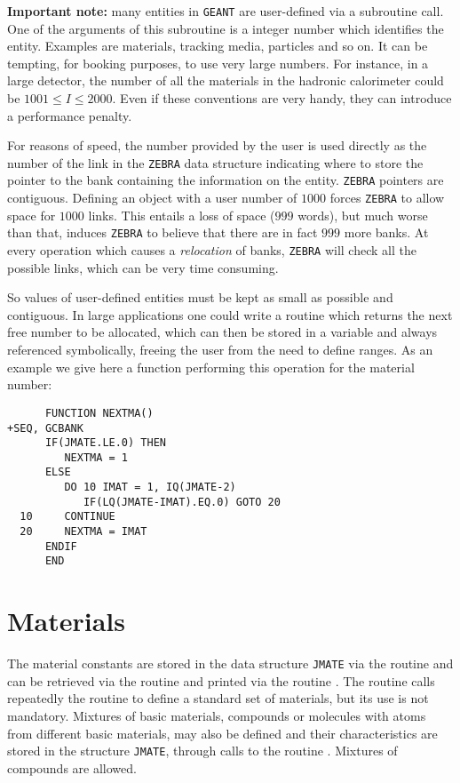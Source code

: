 {\bf Important note:} many entities in {\tt GEANT} are user-defined
via a subroutine call. One of the arguments of this subroutine is 
a integer number which identifies the entity. Examples are materials,
tracking media, particles and so on. It can be tempting, for booking
purposes, to use very large numbers. For instance, in a large detector,
the number of all the materials in the hadronic calorimeter could be
$1001 \leq I \leq 2000$. Even if these conventions are very handy, they
can introduce a performance penalty.

For reasons of speed, the number provided by the user is used directly
as the number of the link in the {\tt ZEBRA} data structure indicating
where to store the pointer to
the bank containing the information on the entity. {\tt ZEBRA} 
pointers are contiguous. Defining an object with a user number of $1000$
forces {\tt ZEBRA} to allow space for $1000$ links. This entails a loss
of space ($999$ words), but much worse than that, induces {\tt ZEBRA} to
believe that there are in fact $999$ more banks. At every operation which 
causes a {\it relocation} of banks, {\tt ZEBRA} will check all the possible 
links, which can be very time consuming.

So values of user-defined entities must be kept as small as possible and
contiguous. In large applications one could write a routine which returns
the next free number to be allocated, which can then be stored in a variable
and always referenced symbolically, freeing the user from the need to define
ranges. As an example we give here a function performing this operation
for the material number:
\begin{verbatim}
      FUNCTION NEXTMA()
+SEQ, GCBANK
      IF(JMATE.LE.0) THEN
         NEXTMA = 1
      ELSE
         DO 10 IMAT = 1, IQ(JMATE-2)
            IF(LQ(JMATE-IMAT).EQ.0) GOTO 20
  10     CONTINUE
  20     NEXTMA = IMAT
      ENDIF
      END
\end{verbatim}

\section{Materials}
The material constants are stored in the data structure {\tt JMATE} via the 
routine  and can be retrieved via the routine  and 
printed via the routine . The routine  calls
repeatedly the routine  to define a standard set of materials, 
but its use is not mandatory. Mixtures of basic materials, compounds or
molecules with atoms
from different basic materials, may also be defined and their characteristics
are stored in the structure {\tt JMATE}, through calls to the routine
. Mixtures of compounds are allowed.


